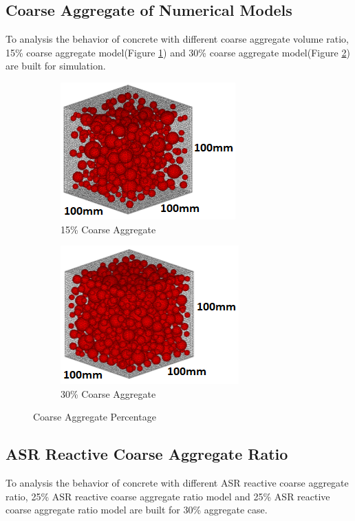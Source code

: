 \subsection{Coarse Aggregate of Numerical Models}

To analysis the behavior of concrete with different coarse aggregate volume ratio, 15\% coarse aggregate model(Figure \ref{fig:A15_model}) and 30\% coarse aggregate model(Figure \ref{fig:A30_model}) are built for simulation.

\begin{figure}[ht!]
\centering
\begin{subfigure}{.5\textwidth}
  \centering
  \includegraphics[width=.4\linewidth]{Files/Aggregate/A15.png}
  \caption{15\% Coarse Aggregate}
  \label{fig:A15_model}
\end{subfigure}%
\begin{subfigure}{.5\textwidth}
  \centering
  \includegraphics[width=.4\linewidth]{Files/Aggregate/A30.png}
  \caption{30\% Coarse Aggregate}
  \label{fig:A30_model}
\end{subfigure}
\caption{Coarse Aggregate Percentage}
\label{fig:Aggregate_Percentage}
\end{figure}

\subsection{ASR Reactive Coarse Aggregate Ratio}

To analysis the behavior of concrete with different ASR reactive coarse aggregate ratio, 25\% ASR reactive coarse aggregate ratio model and 25\% ASR reactive coarse aggregate ratio model are built for 30\% aggregate case.

